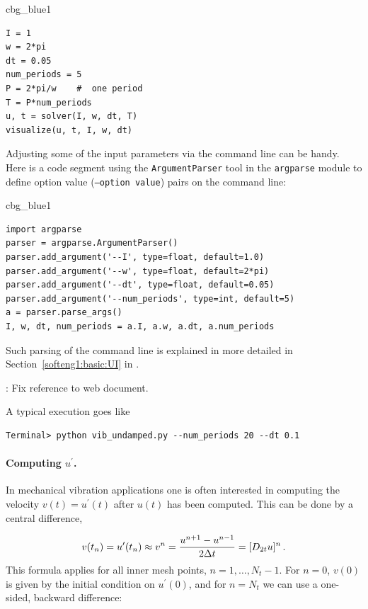 \documentclass[%
oneside,                 %
final,                   %
10pt]{article}
\newenvironment{_cod_tight}[1]{
   \def\FrameCommand{\colorbox{#1}}
   \FrameRule0.6pt\MakeFramed {\FrameRestore}\vskip3mm}
   {\vskip0mm\endMakeFramed}
\newenvironment{cod}[1]{
\bgroup\rmfamily
\fboxsep=0mm\relax
\begin{_cod_tight}{#1}
\list{}{\parsep=-2mm\parskip=0mm\topsep=0pt\leftmargin=2mm
\rightmargin=2\leftmargin\leftmargin=4pt\relax}
\item\relax}
{\endlist\end{_cod_tight}\egroup}
\newcommand{\shortinlinecomment}[3]{{\color{red}{\bf #1}: #2}}
\begin{document}
\begin{cod}{cbg_blue1}\begin{Verbatim}[numbers=none,fontsize=\fontsize{9pt}{9pt},baselinestretch=0.95,xleftmargin=2mm]
I = 1
w = 2*pi
dt = 0.05
num_periods = 5
P = 2*pi/w    #  one period
T = P*num_periods
u, t = solver(I, w, dt, T)
visualize(u, t, I, w, dt)
\end{Verbatim}
\end{cod}
\noindent

Adjusting some of the input parameters via the command line can be
handy. Here is a code segment using the \texttt{ArgumentParser} tool in
the \texttt{argparse} module to define option value (\texttt{--option value})
pairs on the command line:

\begin{cod}{cbg_blue1}\begin{Verbatim}[numbers=none,fontsize=\fontsize{9pt}{9pt},baselinestretch=0.95,xleftmargin=2mm]
import argparse
parser = argparse.ArgumentParser()
parser.add_argument('--I', type=float, default=1.0)
parser.add_argument('--w', type=float, default=2*pi)
parser.add_argument('--dt', type=float, default=0.05)
parser.add_argument('--num_periods', type=int, default=5)
a = parser.parse_args()
I, w, dt, num_periods = a.I, a.w, a.dt, a.num_periods
\end{Verbatim}
\end{cod}
\noindent
Such parsing of the command line is explained in more detailed in
Section~\ref{softeng1:basic:UI} in \cite{Langtangen_decay}.

\shortinlinecomment{hpl 3}{ Fix reference to web document. }{ Fix reference to web }

A typical execution goes like

\begin{Verbatim}[frame=lines,label=\fbox{{\tiny Terminal}},framesep=2.5mm,framerule=0.7pt,fontsize=\fontsize{9pt}{9pt}]
Terminal> python vib_undamped.py --num_periods 20 --dt 0.1
\end{Verbatim}

\paragraph{Computing $u^{\prime}$.}
In mechanical vibration applications one is often interested in
computing the velocity $v(t)=u^{\prime}(t)$ after $u(t)$ has been computed.
This can be done by a central difference,

\begin{equation}
v(t_n)=u^{\prime}(t_n) \approx v^n = \frac{u^{n+1}-u^{n-1}}{2\Delta t} = [D_{2t}u]^n
\tp
\end{equation}
This formula applies for all inner mesh points, $n=1,\ldots,N_t-1$.
For $n=0$, $v(0)$ is given by the initial condition on $u^{\prime}(0)$,
and for $n=N_t$ we can use a one-sided, backward difference:
\end{document}
